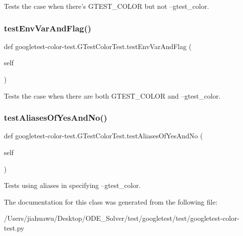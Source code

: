 \begin{DoxyVerb}Tests the case when there's GTEST_COLOR but not --gtest_color.\end{DoxyVerb}
 \mbox{\label{classgoogletest-color-test_1_1_g_test_color_test_a8f6cbbaa18feb66b8b03e6cc1f493f49}} 
\subsubsection{\texorpdfstring{test\+Env\+Var\+And\+Flag()}{testEnvVarAndFlag()}}
{\footnotesize\ttfamily def googletest-\/color-\/test.\+G\+Test\+Color\+Test.\+test\+Env\+Var\+And\+Flag (\begin{DoxyParamCaption}\item[{}]{self }\end{DoxyParamCaption})}

\begin{DoxyVerb}Tests the case when there are both GTEST_COLOR and --gtest_color.\end{DoxyVerb}
 \mbox{\label{classgoogletest-color-test_1_1_g_test_color_test_a82dd36b6a0fa82d417b7ec5e660c6e41}} 
\subsubsection{\texorpdfstring{test\+Aliases\+Of\+Yes\+And\+No()}{testAliasesOfYesAndNo()}}
{\footnotesize\ttfamily def googletest-\/color-\/test.\+G\+Test\+Color\+Test.\+test\+Aliases\+Of\+Yes\+And\+No (\begin{DoxyParamCaption}\item[{}]{self }\end{DoxyParamCaption})}

\begin{DoxyVerb}Tests using aliases in specifying --gtest_color.\end{DoxyVerb}
 

The documentation for this class was generated from the following file\+:\begin{DoxyCompactItemize}
\item 
/\+Users/jiahuawu/\+Desktop/\+O\+D\+E\+\_\+\+Solver/test/googletest/test/googletest-\/color-\/test.\+py\end{DoxyCompactItemize}
